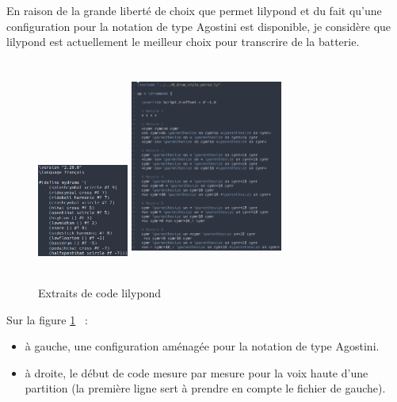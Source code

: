 En raison de la grande liberté de choix que permet lilypond et du fait qu’une
configuration pour la notation de type Agostini est disponible, je considère
que lilypond est actuellement le meilleur choix pour transcrire de la batterie.\\

\begin{figure}[h]
    \centering
    \includegraphics[height=40mm, width=30mm]{
    z_images/3_methodes/transcription_manuelle/drum_perso_1}
    \includegraphics[height=70mm, width=50mm]{
    z_images/3_methodes/transcription_manuelle/extrait_code.png}
    \caption{Extraits de code lilypond}
    \label{extrait_code}
\end{figure}

Sur la figure \ref{extrait_code}~ :
\begin{itemize}
    \item à gauche, une configuration aménagée pour la notation de type Agostini.
    \item à droite, le début de code mesure par mesure pour la voix haute
        d’une partition (la première ligne sert à prendre en compte le fichier
        de gauche).
\end{itemize}

